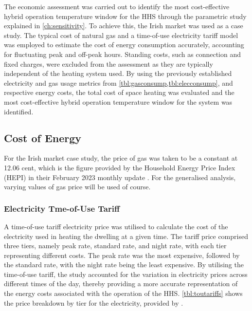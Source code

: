 The economic assessment was carried out to identify the most cost-effective hybrid operation temperature window for the \ac{HHS} through the parametric study explained in \cref{ch:sensitivity}. To achieve this, the Irish market was used as a case study. The typical cost of natural gas and a time-of-use electricity tariff model was employed to estimate the cost of energy consumption accurately, accounting for fluctuating peak and off-peak hours. Standing costs, such as connection and fixed charges, were excluded from the assessment as they are typically independent of the heating system used. By using the previously established electricity and gas usage metrics from \cref{tbl:gasconsump,tbl:elecconsump}, and respective energy costs,  the total cost of space heating was evaluated and the most cost-effective hybrid operation temperature window for the system was identified.

\subsection{Cost of Energy} \label{subsec:costofenergy}
For the Irish market case study, the price of gas was taken to be a constant at 12.06 cent, which is the figure provided by the Household Energy Price Index (HEPI) in their February 2023 monthly update \cite{household_energy_price_index_price_nodate}. For the generalised analysis, varying values of gas price will be used of course. 

\subsubsection{Electricity Tme-of-Use Tariff}\label{subsubsec:electou}
A time-of-use tariff electricity price was utilised to calculate the cost of the electricity used in heating the dwelling at a given time. The tariff price comprised three tiers, namely peak rate, standard rate, and night rate, with each tier representing different costs. The peak rate was the most expensive, followed by the standard rate, with the night rate being the least expensive. By utilising the time-of-use tariff, the study accounted for the variation in electricity prices across different times of the day, thereby providing a more accurate representation of the energy costs associated with the operation of the \ac{HHS}. \cref{tbl:toutariffs} shows the price breakdown by tier for the electricity, provided by \citeauthor{electric_ireland_time--use_2023}. 

